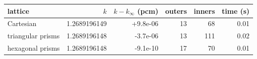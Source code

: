 \begin{tabular}{lrrrrr}
\hline
lattice & $k$ & $k - k_\infty$ (pcm) & outers & inners & time (s)\\
\hline
Cartesian & 1.2689196149 & +9.8e-06 & 13 & 68 & 0.01\\
triangular prisms & 1.2689196148 & -3.7e-06 & 13 & 111 & 0.02\\
hexagonal prisms & 1.2689196148 & -9.1e-10 & 17 & 70 & 0.01\\
\hline
\end{tabular}

